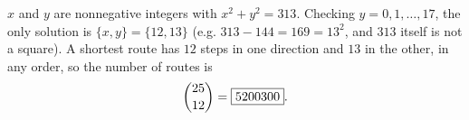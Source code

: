 $x$ and $y$ are nonnegative integers with $x^2+y^2=313$. Checking $y=0,1,\dots,17$, the only solution is $\{x,y\}=\{12,13\}$ (e.g. $313-144=169=13^2$, and $313$ itself is not a square). A shortest route has $12$ steps in one direction and $13$ in the other, in any order, so the number of routes is
\[\dbinom{25}{12}=\boxed{5200300}.\]
